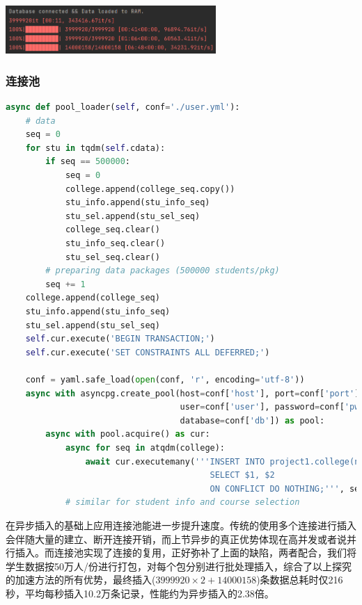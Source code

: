 \centerline{\includegraphics[width=0.6\textwidth]{pic/async.png}}

\subsubsection{连接池}
\begin{lstlisting}[language=python]
async def pool_loader(self, conf='./user.yml'):
    # data
    seq = 0
    for stu in tqdm(self.cdata):
        if seq == 500000:
            seq = 0
            college.append(college_seq.copy())
            stu_info.append(stu_info_seq)
            stu_sel.append(stu_sel_seq)
            college_seq.clear()
            stu_info_seq.clear()
            stu_sel_seq.clear()
        # preparing data packages (500000 students/pkg)
        seq += 1
    college.append(college_seq)
    stu_info.append(stu_info_seq)
    stu_sel.append(stu_sel_seq)
    self.cur.execute('BEGIN TRANSACTION;')
    self.cur.execute('SET CONSTRAINTS ALL DEFERRED;')

    conf = yaml.safe_load(open(conf, 'r', encoding='utf-8'))
    async with asyncpg.create_pool(host=conf['host'], port=conf['port'],
                                   user=conf['user'], password=conf['pwd'],
                                   database=conf['db']) as pool:
        async with pool.acquire() as cur:
            async for seq in atqdm(college):
                await cur.executemany('''INSERT INTO project1.college(name, eng_name)
                                    	 SELECT $1, $2
                                    	 ON CONFLICT DO NOTHING;''', seq)
            # similar for student info and course selection
\end{lstlisting}
\vspace{-3em}\par
在异步插入的基础上应用连接池能进一步提升速度。传统的使用多个连接进行插入会伴随大量的建立、断开连接开销，而上节异步的真正优势体现在高并发或者说并行插入。而连接池实现了连接的复用，正好弥补了上面的缺陷，两者配合，我们将学生数据按50万人/份进行打包，对每个包分别进行批处理插入，综合了以上探究的加速方法的所有优势，最终插入($3999920\times 2+14000158$)条数据总耗时仅216秒，平均每秒插入10.2万条记录，性能约为异步插入的2.38倍。\\\vspace{.3em}

